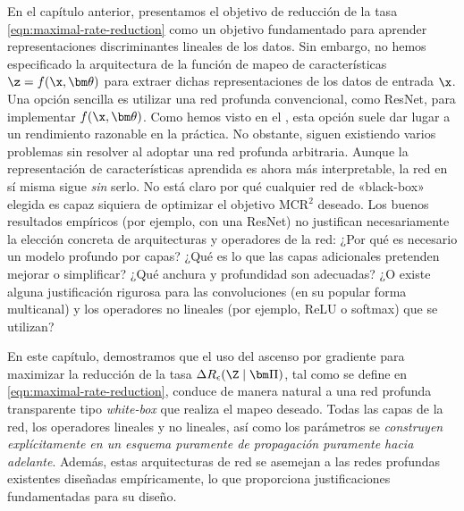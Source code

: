 \documentclass[../../book-main.tex]{subfiles}
\begin{document}
En el capítulo anterior, presentamos el objetivo de reducción de la tasa
\eqref{eqn:maximal-rate-reduction} como un objetivo fundamentado para
aprender representaciones discriminantes lineales de los datos. Sin embargo,
no hemos especificado la arquitectura de la función de mapeo de características $\z =
f(\x, \bm \theta)$ para extraer dichas representaciones de los datos de entrada $\x$.
Una opción sencilla es utilizar una red profunda convencional, como
ResNet, para implementar $f(\x, \bm \theta)$. Como hemos visto en el
, esta opción suele dar lugar a un rendimiento
razonable en la práctica. No obstante, siguen existiendo varios problemas sin resolver
al adoptar una red profunda arbitraria. Aunque la
representación de características aprendida es ahora más interpretable, la red
en sí misma sigue {\em sin} serlo. No está claro por qué cualquier red de «black-box»
elegida es capaz siquiera de optimizar el objetivo MCR$^2$ deseado. Los
buenos resultados empíricos (por ejemplo, con una ResNet) no justifican necesariamente
la elección concreta de arquitecturas y operadores de la red: 
¿Por qué es necesario un modelo profundo por capas? ¿Qué es lo que las capas adicionales
pretenden mejorar o simplificar? ¿Qué anchura y profundidad son adecuadas? ¿O existe
alguna justificación rigurosa para las convoluciones (en su popular
forma multicanal) y los operadores no lineales (por ejemplo, ReLU o softmax) que se utilizan?

En este capítulo, demostramos que el uso del ascenso por gradiente para maximizar la
reducción de la tasa $\Delta R_{\epsilon}(\Z \mid \bm \Pi)$, tal como se define en
\eqref{eqn:maximal-rate-reduction}, conduce de manera natural a una red profunda transparente tipo \textit{white-box}
que realiza el mapeo deseado. Todas las capas de la red, los operadores lineales y no lineales, 
así como los parámetros se {\em construyen explícitamente en un esquema puramente de 
propagación puramente hacia adelante}. Además, estas
arquitecturas de red se asemejan a las redes profundas existentes diseñadas
empíricamente, lo que proporciona justificaciones fundamentadas para su diseño.
\end{document}
